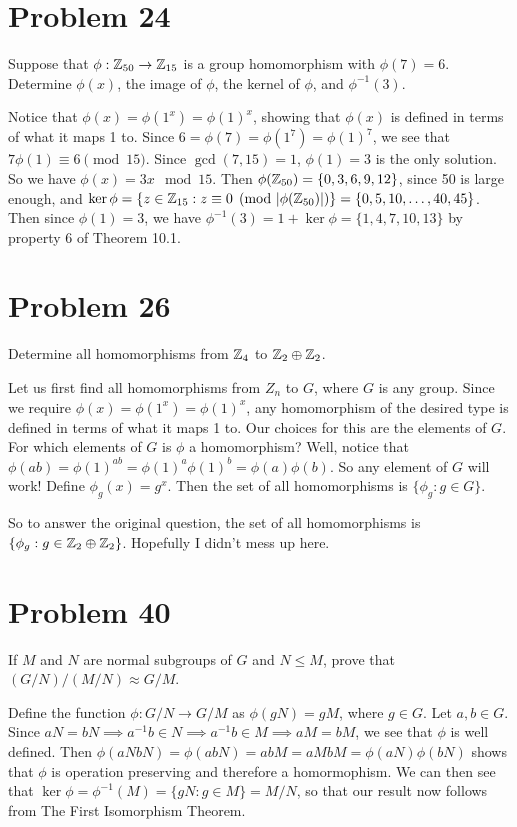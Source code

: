 \documentclass{article}
\begin{document}
\section*{Problem 24}

Suppose that $\phi:\mathbb{Z}_{50}\to\mathbb{Z}_{15}$ is a group homomorphism with $\phi(7)=6$.
Determine $\phi(x)$, the image of $\phi$, the kernel of $\phi$, and $\phi^{-1}(3)$.

Notice that $\phi(x)=\phi(1^x)=\phi(1)^x$, showing that $\phi(x)$ is defined in terms
of what it maps 1 to.  Since $6=\phi(7)=\phi(1^7)=\phi(1)^7$, we see that
$7\phi(1)\equiv 6\pmod{15}$.  Since $\gcd(7,15)=1$, $\phi(1)=3$ is the only solution.
So we have $\phi(x)=3x\mod 15$.  Then $\phi(\mathbb{Z}_{50})=\{0,3,6,9,12\}$, since 50 is large enough,
and $\ker\phi=\{z\in\mathbb{Z}_{15}:z\equiv 0\pmod{|\phi(\mathbb{Z}_{50})|}\}=\{0,5,10,\dots,40,45\}$.
Then since $\phi(1)=3$, we have $\phi^{-1}(3)=1+\ker\phi=\{1,4,7,10,13\}$ by property 6 of Theorem 10.1.

\section*{Problem 26}

Determine all homomorphisms from $\mathbb{Z}_4$ to $\mathbb{Z}_2\oplus\mathbb{Z}_2$.

Let us first find all homomorphisms from $Z_n$ to $G$, where $G$ is any group.
Since we require $\phi(x)=\phi(1^x)=\phi(1)^x$, any homomorphism of the desired type is
defined in terms of what it maps 1 to.  Our choices for this are the elements of $G$.
For which elements of $G$ is $\phi$ a homomorphism?
Well, notice that $\phi(ab)=\phi(1)^{ab}=\phi(1)^a\phi(1)^b=\phi(a)\phi(b)$.
So any element of $G$ will work!  Define $\phi_g(x)=g^x$.
Then the set of all homomorphisms is $\{\phi_g:g\in G\}$.

So to answer the original question, the set of all homomorphisms
is $\{\phi_g:g\in\mathbb{Z}_2\oplus\mathbb{Z}_2\}$.
Hopefully I didn't mess up here.

\section*{Problem 40}

If $M$ and $N$ are normal subgroups of $G$
and $N\leq M$, prove that $(G/N)/(M/N)\approx G/M$.

Define the function $\phi:G/N\to G/M$ as $\phi(gN)=gM$, where $g\in G$.
Let $a,b\in G$.
Since $aN=bN\implies a^{-1}b\in N\implies a^{-1}b\in M\implies aM=bM$, we
see that $\phi$ is well defined.  Then
$\phi(aNbN)=\phi(abN)=abM=aMbM=\phi(aN)\phi(bN)$
shows that $\phi$ is operation preserving and therefore a homormophism.
We can then see that $\ker\phi=\phi^{-1}(M)=\{gN:g\in M\}=M/N$, so that
our result now follows from The First Isomorphism Theorem.
\end{document}
